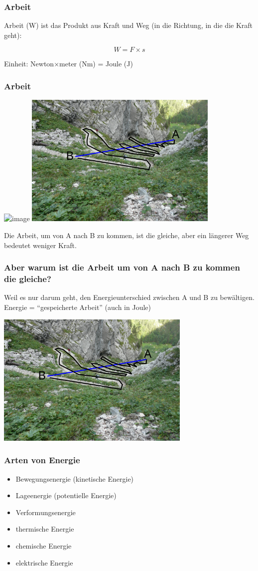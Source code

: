 \documentclass{beamer}
\begin{document}
\begin{frame}
\frametitle{Arbeit}

Arbeit (W) ist das Produkt aus Kraft und Weg (in die Richtung, in die die Kraft geht):

\[W = F\times s\]

Einheit: Newton\(\times\)meter (Nm) = Joule (J)  

\end{frame}


\begin{frame}
\frametitle{Arbeit}


 
\begin{center}
\includegraphics<1>[width=0.7\textwidth]{serpentine.jpg}
\includegraphics<2>[width=0.7\textwidth]{serpentine_anno.png}
\end{center}

Die Arbeit, um von A nach B zu kommen, ist die gleiche, aber ein längerer Weg bedeutet weniger Kraft. 



\end{frame}

\begin{frame}
\frametitle{Aber warum ist die Arbeit um von A nach B zu kommen die gleiche?}

Weil es nur darum geht, den Energieunterschied zwischen A und B zu bewältigen. Energie = ``gespeicherte Arbeit'' (auch in Joule)

\pause

\begin{center}
\includegraphics[width=0.7\textwidth]{serpentine_anno.png}
\end{center}


\end{frame}


\begin{frame}
\frametitle{Arten von Energie}

\begin{itemize}
\item
Bewegungsenergie (kinetische Energie)
\item
Lageenergie (potentielle Energie)
\item
Verformungsenergie
\item
thermische Energie
\item
chemische Energie
\item
elektrische Energie
\end{itemize}

\end{frame}
\end{document}
